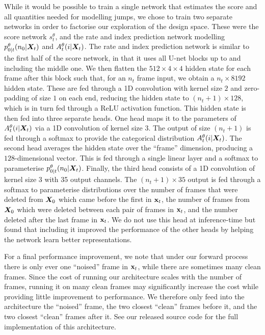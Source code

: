 While it would be possible to train a single network that estimates the score and all quantities needed for modelling jumps, we chose to train two separate networks in order to factorise our exploration of the design space. These were the score network $s_t^\theta$, and the rate and index prediction network modelling $p_{0|t}^\theta(n_0 | {\bm{X}}_t)$ and $A_t^\theta(i | {\bm{X}}_t)$. The rate and index prediction network is similar to the first half of the score network, in that it uses all U-net blocks up to and including the middle one. We then flatten the $512\times4\times4$ hidden state for each frame after this block such that, for an $n_t$ frame input, we obtain a $n_t \times 8192$ hidden state. These are fed through a 1D convolution with kernel size $2$ and zero-padding of size $1$ on each end, reducing the hidden state to $(n_t+1) \times 128$, which is in turn fed through a ReLU activation function. This hidden state is then fed into three separate heads. One head maps it to the parameters of $A_t^\theta(i | {\bm{X}}_t)$ via a 1D convolution of kernel size 3. The output of size $(n_t+1)$ is fed through a softmax to provide the categorical distribution $A_t^\theta(i | {\bm{X}}_t)$. The second head averages the hidden state over the ``frame'' dimension, producing a $128$-dimensional vector. This is fed through a single linear layer and a softmax to parameterise $p_{0|t}^\theta(n_0 | {\bm{X}}_t)$. Finally, the third head consists of a 1D convolution of kernel size 3 with 35 output channels. The $(n_t+1)\times35$ output is fed through a softmax to parameterise distributions over the number of frames that were deleted from ${\bm{X}}_0$ which came before the first in ${\mathbf{x}}_t$, the number of frames from ${\bm{X}}_0$ which were deleted between each pair of frames in ${\mathbf{x}}_t$, and the number deleted after the last frame in ${\mathbf{x}}_t$. We do not use this head at inference-time but found that including it improved the performance of the other heads by helping the network learn better representations. 

For a final performance improvement, we note that under our forward process there is only ever one ``noised'' frame in ${\mathbf{x}}_t$, while there are sometimes many clean frames. Since the cost of running our architecture scales with the number of frames, running it on many clean frames may significantly increase the cost while providing little improvement to performance. We therefore only feed into the architecture the ``noised'' frame, the two closest ``clean'' frames before it, and the two closest ``clean'' frames after it. See our released source code for the full implementation of this architecture.

